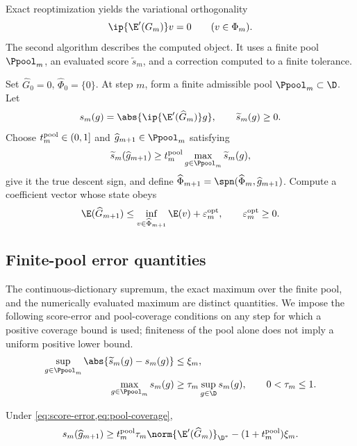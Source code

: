 Exact reoptimization yields the variational orthogonality
\begin{equation}
 \ip{\E'(G_m)}v=0\qquad(v\in\Phi_m).
 \label{eq:orthogonality}
\end{equation}
The second algorithm describes the computed object. It uses a finite pool \(\Ppool_m\), an evaluated
score \(\widetilde s_m\), and a correction computed to a finite tolerance.

\begin{algorithm}[htbp]
\caption{Finite-pool inexact CGA}
\label{alg:finite}
Set \(\widehat G_0=0\), \(\widehat\Phi_0=\{0\}\). At step \(m\), form a finite admissible pool
\(\Ppool_m\subset\D\). Let
\[
 s_m(g)=\abs{\ip{\E'(\widehat G_m)}g},
 \qquad \widetilde s_m(g)\geq0.
\]
Choose \(t_m^{\rm pool}\in(0,1]\) and \(\widehat g_{m+1}\in\Ppool_m\) satisfying
\[
 \widetilde s_m(\widehat g_{m+1})
 \geq t_m^{\rm pool}\max_{g\in\Ppool_m}\widetilde s_m(g),
\]
give it the true descent sign, and define
\(\widehat\Phi_{m+1}=\spn(\widehat\Phi_m,\widehat g_{m+1})\). Compute a coefficient vector whose state
obeys
\[
 \E(\widehat G_{m+1})
 \leq\inf_{v\in\widehat\Phi_{m+1}}\E(v)+\varepsilon_m^{\rm opt},
 \qquad \varepsilon_m^{\rm opt}\geq0.
\]
\end{algorithm}

\subsection{Finite-pool error quantities}
\label{sec:controlled-selection}

The continuous-dictionary supremum, the exact maximum over the finite pool, and the
numerically evaluated maximum are distinct quantities. We impose the following
score-error and pool-coverage conditions on any step for which a positive coverage
bound is used; finiteness of the pool alone does not imply a uniform positive lower bound.
\begin{align}
 \sup_{g\in\Ppool_m}\abs{\widetilde s_m(g)-s_m(g)}&\leq\xi_m,
 \label{eq:score-error}\\
 \max_{g\in\Ppool_m}s_m(g)&\geq
 \tau_m\sup_{g\in\D}s_m(g),\qquad0<\tau_m\leq1.
 \label{eq:pool-coverage}
\end{align}

\begin{lemma}
\label{lem:true-score}
Under \cref{eq:score-error,eq:pool-coverage},
\begin{equation}
 s_m(\widehat g_{m+1})\geq
 t_m^{\rm pool}\tau_m\norm{\E'(\widehat G_m)}_{\D^*}
 -(1+t_m^{\rm pool})\xi_m.
\label{eq:true-score-lower}
\end{equation}
\end{lemma}

